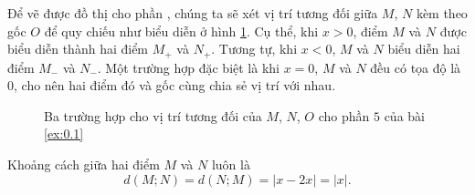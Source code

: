 Để vẽ được đồ thị cho phần , chúng ta sẽ xét vị trí tương đối giữa $M$, $N$ kèm theo gốc $O$ để quy chiếu như biểu diễn ở hình \ref{fig:truc phan 5}. Cụ thể, khi $x>0$, điểm $M$ và $N$ được biểu diễn thành hai điểm $M_+$ và $N_+$. Tương tự, khi $x<0$, $M$ và $N$ biểu diễn hai điểm $M_-$ và $N_-$. Một trường hợp đặc biệt là khi $x=0$, $M$ và $N$ đều có tọa độ là $0$, cho nên hai điểm đó và gốc cùng chia sẻ vị trí với nhau.

\begin{figure}[H]
   \centering
   \caption{Ba trường hợp cho vị trí tương đối của $M$, $N$, $O$ cho phần $5$ của bài \ref{ex:0.1}}
   \label{fig:truc phan 5}
\end{figure}

Khoảng cách giữa hai điểm $M$ và $N$ luôn là $$d(M;N)=d(N;M)=|x-2x|=|x|.$$